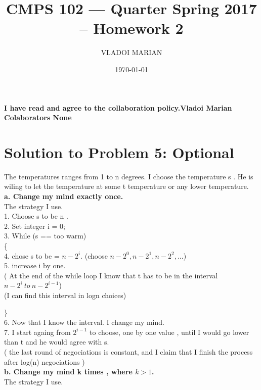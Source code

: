 \documentclass[11 pt]{article}
\title{ CMPS 102 --- Quarter  Spring 2017 --  Homework 2}
\author{VLADOI MARIAN}
\date{\today}
\begin{document}
\maketitle



\begin{center}
{\bf I have read and agree to the collaboration policy.Vladoi Marian}\\
{\bf Colaborators None }
\end{center}


\section*{Solution to Problem 5: Optional}

The temperatures ranges from 1 to n degrees. I choose the temperature s . He is wiling to let the temperature at some t temperature or any lower temperature.\\

\textbf{a. Change my mind exactly once.}\\
The strategy  I use.\\

1. Choose s to be n . \\
2. Set integer i = 0;\\
3. While (s ==  too warm) \\
  \{\\
  4. chose s to be =   $n - 2^i $.   (choose  $n- 2^0,  n - 2^1, n-2^2, ...$)\\
  5.  increase i by one.  \\
 ( At the end of the while loop I know that t has to be in the interval $ n - 2^i \  to \  n- 2^{i-1}$)\\
 (I can find this interval in logn choices)

\}\\
6. Now that I know the interval. I change my mind. \\
7. I start againg from $2^{i-1} $ to choose, one by one value , until  I would go lower than t and he would agree with s. \\
( the last round of negociations is constant, and I claim that I finish the process  after log(n) negociations )\\


\textbf{ b. Change my mind k times , where $k > 1$.}\\
The strategy I use.\\
\end{document}

